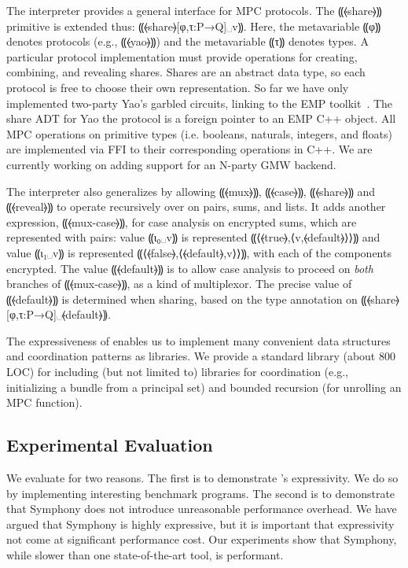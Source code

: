 The \system interpreter provides a general interface for MPC
protocols. The ⸨⦑share⦒⸩ primitive is extended thus:
⸨⦑share⦒[φ,τ:P→Q]␣v⸩. Here, the metavariable ⸨φ⸩ denotes protocols
(e.g., ⸨⦑yao⦒⸩) and the metavariable ⸨τ⸩ denotes types. A
particular protocol implementation must provide operations for creating, combining,
and revealing shares. Shares are an abstract data type, so each protocol is free to
choose their own representation. So far we have only implemented
two-party Yao's garbled circuits, linking to the EMP toolkit~\cite{emp-toolkit}.
The share ADT for Yao the protocol is a foreign pointer to
an EMP C++ object. All MPC operations on primitive types (i.e. booleans,
naturals, integers, and floats) are implemented via FFI to their
corresponding operations in C++. We are currently working on adding
support for an N-party GMW backend.

The interpreter also generalizes \mpc
by allowing ⸨⦑mux⦒⸩, ⸨⦑case⦒⸩, ⸨⦑share⦒⸩ and ⸨⦑reveal⦒⸩ to operate
recursively over on pairs, sums, and lists. It adds another expression,
⸨⦑mux-case⦒⸩, for case analysis on encrypted sums, which are
represented with pairs: \mpc value ⸨ι₀␣v⸩ is represented
⸨⟨⦑true⦒,⟨v,⦑default⦒⟩⟩⸩ and value ⸨ι₁␣v⸩ is represented
⸨⟨⦑false⦒,⟨⦑default⦒,v⟩⟩⸩, with each of the components encrypted. The value
⸨⦑default⦒⸩ is to allow case analysis to proceed on \emph{both} branches of
⸨⦑mux-case⦒⸩, as a kind of multiplexor. The precise value of ⸨⦑default⦒⸩ is
determined when sharing, based on the type annotation on
⸨⦑share⦒[φ{,}τ{:}P{→}Q]␣⦑default⦒⸩.

The expressiveness of \system{} enables us to implement many convenient data structures
and coordination patterns as libraries. We provide a standard library (about 800 LOC) for \system{}
including (but not limited to) libraries for coordination (e.g., initializing a bundle from a principal
set) and bounded recursion (for unrolling an MPC function).

\subsection{Experimental Evaluation}
\label{subsec:mpc-impl-eval}

We evaluate \system for two reasons.
The first is to demonstrate \system's expressivity.
We do so by implementing interesting benchmark programs.
The second is to demonstrate that Symphony does not introduce unreasonable performance overhead.
We have argued that Symphony is highly expressive, but it is
important that expressivity not come at significant performance cost.
Our experiments show that Symphony, while slower than one state-of-the-art tool,
is performant.

